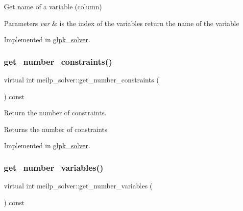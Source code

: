 Get name of a variable (column) 


\begin{DoxyParams}{Parameters}
{\em var} & is the index of the variables return the name of the variable \\
\hline
\end{DoxyParams}


Implemented in \hyperlink{classglpk__solver_a00812df3ae9f05cbddd617425d8398da}{glpk\+\_\+solver}.

\mbox{\label{classmeilp__solver_a0045d972eeb07fca06d9ac59ef802a86}} 
\subsubsection{\texorpdfstring{get\+\_\+number\+\_\+constraints()}{get\_number\_constraints()}}
{\footnotesize\ttfamily virtual int meilp\+\_\+solver\+::get\+\_\+number\+\_\+constraints (\begin{DoxyParamCaption}{ }\end{DoxyParamCaption}) const\hspace{0.3cm}{\ttfamily [pure virtual]}}



Return the number of constraints. 

\begin{DoxyReturn}{Returns}
the number of constraints 
\end{DoxyReturn}


Implemented in \hyperlink{classglpk__solver_ab92636d941e8052c7a24f8fc7de12eb8}{glpk\+\_\+solver}.

\mbox{\label{classmeilp__solver_abcbe8b799332dd2f29c042488e3655ab}} 
\subsubsection{\texorpdfstring{get\+\_\+number\+\_\+variables()}{get\_number\_variables()}}
{\footnotesize\ttfamily virtual int meilp\+\_\+solver\+::get\+\_\+number\+\_\+variables (\begin{DoxyParamCaption}{ }\end{DoxyParamCaption}) const\hspace{0.3cm}{\ttfamily [pure virtual]}}



